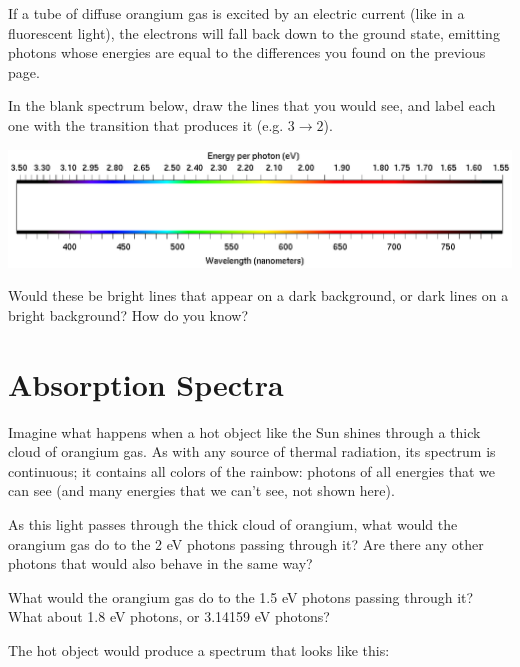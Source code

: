 \documentclass[11pt]{article}
\newcommand{\BC}{\begin{center}}
\newcommand{\EC}{\end{center}}
\begin{document}
\newpage


If a tube of diffuse orangium gas is excited by an electric current (like in a fluorescent light), the electrons will fall back down to the ground state, emitting photons whose energies are equal to the differences you found on the previous page. 

In the blank spectrum below, draw the lines that you would see, and label each one with the transition that produces it (e.g. $3 \rightarrow 2$).

\BC
\includegraphics[width=7in]{spectrum-blank.png}
\EC

Would these be bright lines that appear on a dark background, or dark lines on a bright background? How do you know?

\vspace{1.2in}

\section{Absorption Spectra}

Imagine what happens when a hot object like the Sun shines through a thick cloud of orangium gas. As with any source of thermal radiation, its spectrum is continuous; it contains all colors of the rainbow: photons of all energies that we can see (and many energies that we can't see, not shown here).

As this light passes through the thick cloud of orangium, what would the orangium gas do to the 2 eV photons passing through it? Are there any other photons that would also behave in the same way?

\vspace{1in}

What would the orangium gas do to the 1.5 eV photons passing through it? What about 1.8 eV photons, or 3.14159 eV photons?

\vspace{0.5in}

\newpage


 The hot object would produce a spectrum that looks like this:
\end{document}
